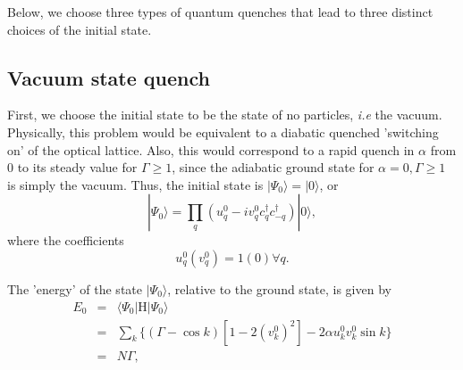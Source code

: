 \documentclass[a4paper,10pt]{article}
\begin{document}
Below, we choose three types of quantum quenches that lead to three distinct choices of the initial state.
\subsection{Vacuum state quench}
First, we choose the initial state to be the state of no particles, \textit{i.e} the vacuum. Physically, this problem would be equivalent to a diabatic quenched 'switching on' of the optical lattice. Also, this would correspond to a rapid quench in $\alpha$ from $0$ to its steady value for $\Gamma\geq1$, since the adiabatic ground state for $\alpha=0, \Gamma\geq 1$ is simply the vacuum. Thus, the initial state is $|\Psi_0\rangle = |0\rangle$, or
\begin{equation}
\label{eq:psi0}
|\Psi_0\rangle=\prod_q \left(u^0_q-iv^0_qc^\dagger_{q}c^\dagger_{-q}\right)|0\rangle,
\end{equation}
where the coefficients
\begin{equation}
\label{eq:icg}
u^0_q (v^0_q) = 1 (0) \forall q.
\end{equation}
\begin{comment}

\textbf{Warning:Old Notation}\\


Thus, using Eqns~\ref{eq:psi0:ebasis} and~\ref{eq:psi0}, as well as Eqn~\ref{eq:towerofestates} we get
\begin{eqnarray}
C_\gamma &=& \langle\gamma|\Psi_0\rangle \nonumber \\
         &=& _B\langle0|\alpha^{ }_{k_m} \alpha^{ }_{k_{m-1}}\dots \alpha^{ }_{k_2}\alpha^{ }_{k_1}\prod_q \left(u^0_q-iv^0_qc^\dagger_{q}c^\dagger_{-q}\right)|0\rangle \nonumber \\
         &=& \prod_{k\in\gamma}\left(v^{ }_ku^0_k-u^{ }_kv^0_k\right) \prod_{q\not\in\gamma}\left(u^{ }_qu^0_q+v^{ }_qv^0_q\right).
\end{eqnarray}
Here, $\gamma$ denotes a particular combination of $m$ sets of excited momenta $k_1\dots k_m$. 
\end{comment}
The 'energy' of the state $|\Psi_0\rangle$, relative to the ground state, is given by
\begin{eqnarray}
E_0 &=& \langle\Psi_0|\mathrm{H}|\Psi_0\rangle \nonumber \\
    &=& \sum_k\bigg\{\left(\Gamma-\cos{k}\right)\left[1-2(v^0_k)^2\right]-2\alpha u^0_kv^0_k\sin{k}\bigg\} \nonumber \\
    &=& N\Gamma,
\end{eqnarray}
\end{document}
